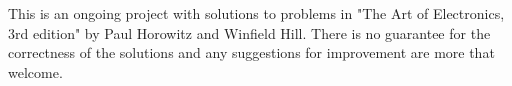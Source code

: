 This is an ongoing project with solutions to problems in "The Art of Electronics, 3rd edition" by Paul Horowitz and Winfield Hill. There is no guarantee for the correctness of the solutions and any suggestions for improvement are more that welcome.